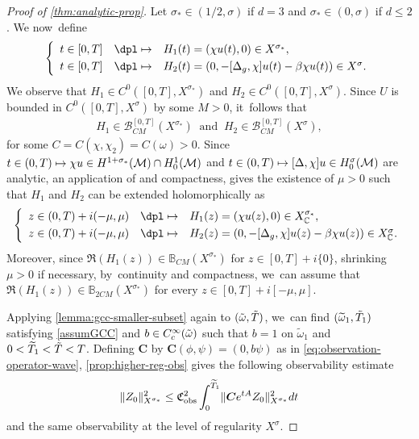 \documentclass[JEP,XML,SOM,Unicode,published]{cedram}
\newcommand\mto{\mathchoice{\longmapsto}{\mapsto}{\mapsto}{\mapsto}}
\theoremstyle{definition}
\let\mc\mathcal
\newcommand{\B}{\mc{B}}
\newcommand{\M}{\mc{M}}
\newcommand{\bC}{\boldsymbol{C}}
\providecommand{\norm}[1]{\lVert#1\rVert}
\begin{document}
\begin{proof}[Proof of \cref{thm:analytic-prop}]
Let $\sigma_*\in (1/2, \sigma)$ if $d=3$ and $\sigma_*\in (0,\sigma)$ if $d\leq 2$. We now~define\vspace*{-3pt}
\begin{align*}
\left\{\begin{array}{ccl}
t\in [0, T] & \dpl\mto & H_1(t)=(\chi u(t), 0)\in X^{\sigma_*}, \\[3pt]
t\in [0, T] & \dpl\mto & H_2(t)=(0, -[\Delta_g, \chi]u(t)-\beta \chi u(t))\in X^\sigma.
\end{array}\right.
\end{align*}
We observe that $H_1\in C^0([0, T], X^{\sigma_*})$ and $H_2\in C^0([0, T], X^\sigma)$. Since $U$ is bounded in $C^0([0, T], X^\sigma)$ by some $M>0$, it~follows that\vspace*{-3pt}
\begin{align*}
H_1\in \B_{CM}^{[0, T]}(X^{\sigma_*})\ \text{ and }\ H_2\in \B_{CM}^{[0, T]}(X^\sigma),
\end{align*}
for some $C=C(\chi,\chi_2)=C(\omega)>0$. Since $t\in (0, T)\mto \chi u\in H^{1+\sigma_*}(\M)\cap H_0^1(\M)$ and $t\in (0, T)\mto [\Delta, \chi] u\in H^{\sigma}_0(\M)$ are analytic, an application of \cite[Th.\,7.2]{BS:71-analytic} and compactness, gives the existence of $\mu>0$ such that $H_1$ and $H_2$ can be extended holomorphically as
\begin{align*}
\left\{\begin{array}{ccl}
z\in (0, T)+i(-\mu, \mu) & \dpl\mto & H_1(z)=(\chi u(z), 0)\in X_\mathbb{C}^{\sigma_*}, \\[3pt]
z\in (0, T)+i(-\mu, \mu) & \dpl\mto & H_2(z)=(0, -[\Delta_g, \chi]u(z)-\beta \chi u(z))\in X_\mathbb{C}^\sigma.
\end{array}\right.
\end{align*}
Moreover, since $\Re(H_1(z))\in \mathbb{B}_{CM}(X^{\sigma_*})$ for $z\in[0,T]+i\{0\}$, shrinking $\mu>0$ if necessary, by~continuity and compactness, we~can assume that $\Re(H_1(z))\in \mathbb{B}_{2CM}(X^{\sigma_*})$ for every $z\in [0, T]+i[-\mu, \mu]$.

Applying \cref{lemma:gcc-smaller-subset} again to $(\Tilde{\omega},\Tilde{T})$, we~can find $(\widetilde{\omega}_1,\Tilde{T}_1)$ satisfying \ref{assumGCC} and $b\in C^{\infty}_c(\Tilde{\omega})$ such that $b=1$ on $\widetilde{\omega}_1$ and $0<\widetilde{T}_1<\Tilde{T}<T$. Defining $\bC$ by $\bC(\phi, \psi)=(0, b\psi)$ as in \eqref{eq:observation-operator-wave}, \cref{prop:higher-reg-obs} gives the following observability estimate\vspace*{-3pt}
\begin{align}\label{thm:ineq:LWobshighTstar}
\norm{Z_0}_{X^{\sigma_*}}^2\leq \mathfrak{C}_{\textup{obs}}^2\int_0^{\widetilde{T}_1} \norm{\bC e^{tA}Z_0}_{X^{\sigma_*}}^2 dt
\end{align}
and the same observability at the level of regularity $X^{\sigma}$.


\end{proof}
\end{document}
